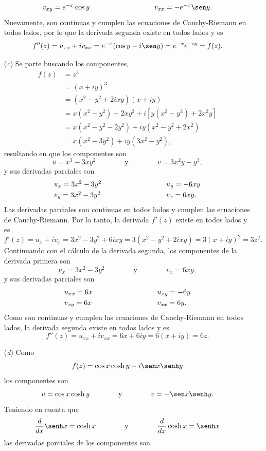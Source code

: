 \documentclass[a4paper]{report}
\begin{document}
\begin{enumerate}
\[\begin{array}{ll}
  v_{xy}=e^{-x}\cos y\qquad\qquad\qquad\qquad&v_{xx}=-e^{-x}\sen y.
 \end{array}
 \]
 Nuevamente, son continuas y cumplen las ecuaciones de Cauchy-Riemann en todos lados, por lo que la derivada segunda existe en todos lados y es
 \[
  f''(z)=u_{xx}+iv_{xx}=e^{-x}(\cos y-i\sen y)=e^{-x}e^{-iy}=f(z).
 \]
 \item[(\textit{c})] Se parte buscando los componentes,
 \begin{align*}
  f(z)&=z^3\\
   &=(x+iy)^3\\
   &=(x^2-y^2+2ixy)(x+iy)\\
   &=x(x^2-y^2)-2xy^2+i\left[y(x^2-y^2)+2x^2y\right]\\
   &=x(x^2-y^2-2y^2)+iy(x^2-y^2+2x^2)\\
   &=x(x^2-3y^2)+iy(3x^2-y^2),
 \end{align*}
 resultando en que los componentes son 
 \[
  u=x^3-3xy^2
  \qquad\qquad\textrm{y}\qquad\qquad
  v=3x^2y-y^3,
 \]
 y sus derivadas parciales son 
 \[
 \begin{array}{ll}
  u_x=3x^2-3y^2\qquad\qquad\qquad\qquad&u_y=-6xy\\[\smallskipamount]
  v_y=3x^2-3y^2\qquad\qquad\qquad\qquad&v_x=6xy.
 \end{array}
 \]
 Las derivadas parciales son continuas en todos lados y cumplen las ecuaciones de Cauchy-Riemann. Por lo tanto, la derivada \(f'(z)\) existe en todos lados y es
 \[
  f'(z)=u_x+iv_x=3x^2-3y^2+6ixy=3(x^2-y^2+2ixy)=3(x+iy)^2=3z^2.
 \]
 Continuando con el cálculo de la derivada segunda, los componentes de la derivada primera son
 \[
  u_x=3x^2-3y^2
  \qquad\qquad\textrm{y}\qquad\qquad
  v_x=6xy,
 \]
 y sus derivadas parciales son 
 \[
 \begin{array}{ll}
  u_{xx}=6x\qquad\qquad\qquad\qquad&u_{xy}=-6y\\[\smallskipamount]
  v_{xy}=6x\qquad\qquad\qquad\qquad&v_{xx}=6y.
 \end{array}
 \]
 Como son continuas y cumplen las ecuaciones de Cauchy-Riemann en todos lados, la derivada segunda existe en todos lados y es
 \[
  f''(z)=u_{xx}+iv_{xx}=6x+6iy=6(x+iy)=6z.
 \]
 \item[(\textit{d})] Como
 \[
  f(z)=\cos x\cosh y-i\sen x\senh y
 \]
 los componentes son 
 \[
  u=\cos x\cosh y
  \qquad\qquad\textrm{y}\qquad\qquad
  v=-\sen x\senh y.
 \]
 Teniendo en cuenta que 
 \[
  \frac{d}{dx}\senh x=\cosh x
  \qquad\qquad\textrm{y}\qquad\qquad
  \frac{d}{dx}\cosh x=\senh x
 \]
 las derivadas parciales de los componentes son 

\end{enumerate}
\end{document}
